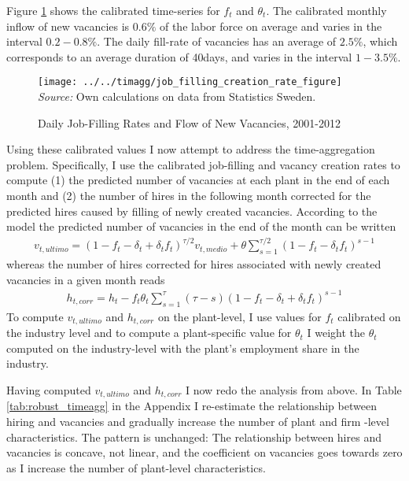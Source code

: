 Figure \ref{fig:filling_rates} shows the calibrated time-series for $f_t$ and $\theta_t$. The calibrated monthly inflow of new vacancies is $0.6 \%$ of the labor force on average and varies in the interval $0.2-0.8 \%$. The daily fill-rate of vacancies has an average of $2.5 \%$, which corresponds to an average duration of 40days, and varies in the interval $1-3.5\%$. 

\begin{figure}[h]
\centering
\caption{Daily Job-Filling Rates and Flow of New Vacancies, 2001-2012}
\texttt{[image: ../../timagg/job\_filling\_creation\_rate\_figure]}
\flushleft
\footnotesize{\emph{Source:} Own calculations on data from Statistics Sweden.}
\label{fig:filling_rates}
\end{figure}

Using these calibrated values I now attempt to address the time-aggregation problem. Specifically, I use the calibrated job-filling  and vacancy creation rates to compute (1) the predicted number of vacancies at each plant in the end of each month and (2) the number of hires in the following month corrected for the predicted hires caused by filling of newly created vacancies. According to the model the predicted number of vacancies in the end of the month can be written
\begin{align}
v_{t,ultimo}=\left( 1-f_t-\delta_t+\delta_t f_t \right)^{\tau/2} v_{t,medio} + \theta \sum_{s=1}^{\tau/2} \left( 1-f_t-\delta_t f_t \right)^{s-1}
\end{align}
whereas the number of hires corrected for hires associated with newly created vacancies in a given month reads
\begin{align}
h_{t,corr}=h_t-f_t \theta_t \sum_{s=1}^{\tau} \left( \tau- s\right) \left( 1-f_t-\delta_t+\delta_t f_t \right)^{s-1}
\end{align}
To compute $v_{t,ultimo}$ and $h_{t,corr}$ on the plant-level, I use values for $f_t$ calibrated on the industry level and to compute a plant-specific value for $\theta_t$ I weight the $\theta_t$ computed on the industry-level with the plant's employment share in the industry.

Having computed $v_{t,ultimo}$ and $h_{t,corr}$ I now redo the analysis from above. In Table \ref{tab:robust_timeagg} in the Appendix I re-estimate the relationship between hiring and vacancies and gradually increase the number of plant and firm -level characteristics. The pattern is unchanged: The relationship between hires and vacancies is concave, not linear, and the coefficient on vacancies goes towards zero as I increase the number of plant-level characteristics. 

